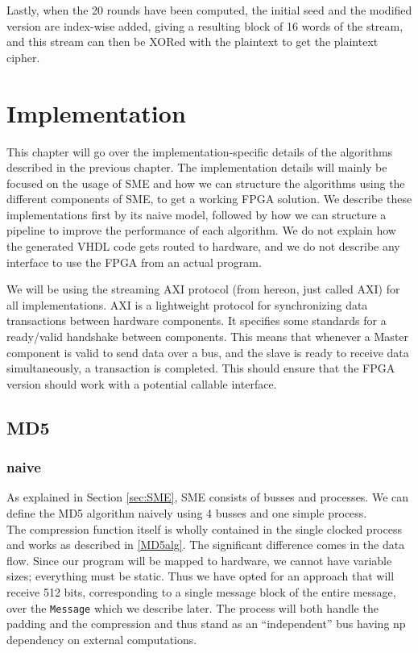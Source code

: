 \documentclass[a4paper, openany]{book}
\begin{document}
\begin{abstact}
Lastly, when the 20 rounds have been computed, the initial seed and the modified version are index-wise added, giving a resulting block of 16 words of the stream, and this stream can then be XORed with the plaintext to get the plaintext cipher.

\chapter{Implementation}
\label{sec:orgabed927}
This chapter will go over the implementation-specific details of the algorithms described in the previous chapter. The implementation details will mainly be focused on the usage of SME and how we can structure the algorithms using the different components of SME, to get a working FPGA solution. We describe these implementations first by its naive model, followed by how we can structure a pipeline to improve the performance of each algorithm. We do not explain how the generated VHDL code gets routed to hardware, and we do not describe any interface to use the FPGA from an actual program.

We will be using the streaming AXI protocol (from hereon, just called AXI) for all implementations. AXI is a lightweight protocol for synchronizing data transactions between hardware components. It specifies some standards for a ready/valid handshake between components. This means that whenever a Master component is valid to send data over a bus, and the slave is ready to receive data simultaneously, a transaction is completed. This should ensure that the FPGA version should work with a potential callable interface.
\section{MD5}
\label{sec:org2a7ed17}
\subsection{naive}
\label{MD5naive}
As explained in Section \ref{sec:SME}, SME consists of busses and processes. We can define the MD5 algorithm naively using 4 busses and one simple process.\\

The compression function itself is wholly contained in the single clocked process and works as described in \ref{MD5alg}. The significant difference comes in the data flow. Since our program will be mapped to hardware, we cannot have variable sizes; everything must be static. Thus we have opted for an approach that will receive 512 bits, corresponding to a single message block of the entire message, over the \texttt{Message} which we describe later. The process will both handle the padding and the compression and thus stand as an ``independent'' bus having np dependency on external computations.


\end{abstact}
\end{document}
